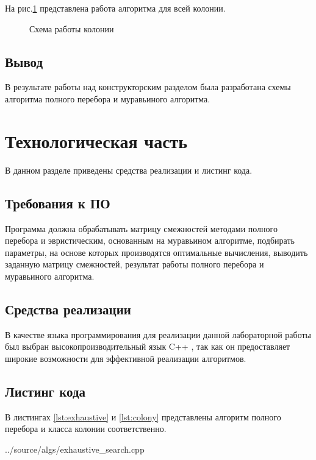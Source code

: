 \documentclass[a4paper,14pt]{extreport}
\newcommand{\imgext}[4] {
	\begin{figure}[h!]
		\center{\texttt{[image: inc/img/\#2.\#3]}}
		\caption{#4}
		\label{img:#2}
	\end{figure}
}
\begin{document}
На рис.\ref{img:ants} представлена работа алгоритма для всей колонии.

\imgext{height=110mm}{ants}{pdf}{Схема работы колонии}

\section*{Вывод}

В результате работы над конструкторским разделом была разработана схемы алгоритма полного перебора и муравьиного алгоритма.


\chapter{Технологическая часть}

В данном разделе приведены средства реализации и листинг кода.

\section{Требования к ПО}

Программа должна обрабатывать матрицу смежностей методами полного перебора и эвристическим, основанным на муравьином алгоритме, подбирать параметры, на основе которых производятся оптимальные вычисления, выводить заданную матрицу смежностей, результат работы полного перебора и муравьиного алгоритма.

\section{Средства реализации}

В качестве языка программирования для реализации данной лабораторной работы был выбран высокопроизводительный язык C++ \cite{cpp17}, так как он предоставляет широкие возможности для эффективной реализации алгоритмов.

\section{Листинг кода}

В листингах \ref{lst:exhaustive} и \ref{lst:colony} представлены алгоритм полного перебора и класса колонии соответственно.

\begin{lstinputlisting}[
	caption={Алгоритм полного перебора},
	label={lst:exhaustive},
	style={cpp},
	linerange={16-45}
	]{../source/algs/exhaustive_search.cpp}
\end{lstinputlisting}
\end{document}

